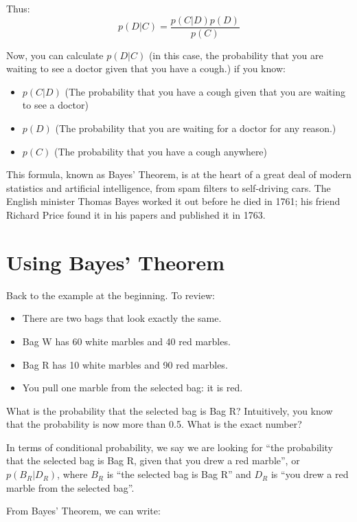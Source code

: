 Thus:
$$p(D | C) = \frac {p(C | D)p(D)}{p(C)}$$

Now, you can calculate $p(D | C)$ (in this case, the probability that
you are waiting to see a doctor given that you have a cough.) if you
know:

\begin{itemize}
\item $p(C | D)$ (The probability that you have a cough given that you are waiting to see a doctor)
\item $p(D)$ (The probability that you are waiting for a doctor for any reason.)
\item $p(C)$ (The probability that you have a cough anywhere)
\end{itemize}

This formula, known as Bayes' Theorem, is at the heart of a great deal of
modern statistics and artificial intelligence, from spam filters to
self-driving cars. The English minister Thomas Bayes worked it out before
he died in 1761; his friend Richard Price found it in his papers and
published it in 1763.

\section{Using Bayes' Theorem}

Back to the example at the beginning. To review:

\begin{itemize}
\item There are two bags that look exactly the same.
\item Bag W has 60 white marbles and 40 red marbles.
\item Bag R has 10 white marbles and 90 red marbles.
\item You pull one marble from the selected bag: it is red.
\end{itemize}

What is the probability that the selected bag is Bag R? Intuitively,
you know that the probability is now more than 0.5. What is the exact
number?

In terms of conditional probability, we say we are looking for ``the probability
that the selected bag is Bag R, given that you drew a red marble'', or
$p(B_R | D_R)$, where $B_R$ is ``the selected bag is Bag R'' and $D_R$ is
``you drew a red marble from the selected bag''.

From Bayes' Theorem, we can write:

